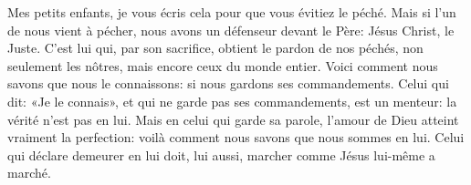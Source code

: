 Mes petits enfants, je vous écris cela pour que vous évitiez le péché.
Mais si l’un de nous vient à pécher, nous avons un défenseur devant le Père:
	Jésus Christ, le Juste.
C’est lui qui, par son sacrifice, obtient le pardon de nos péchés,
	non seulement les nôtres, mais encore ceux du monde entier.
Voici comment nous savons que nous le connaissons:
	si nous gardons ses commandements.
Celui qui dit: «Je le connais»,
	et qui ne garde pas ses commandements, est un menteur:
	la vérité n’est pas en lui.
Mais en celui qui garde sa parole,
	l’amour de Dieu atteint vraiment la perfection:
	voilà comment nous savons que nous sommes en lui.
Celui qui déclare demeurer en lui
	doit, lui aussi, marcher comme Jésus lui-même a marché.
